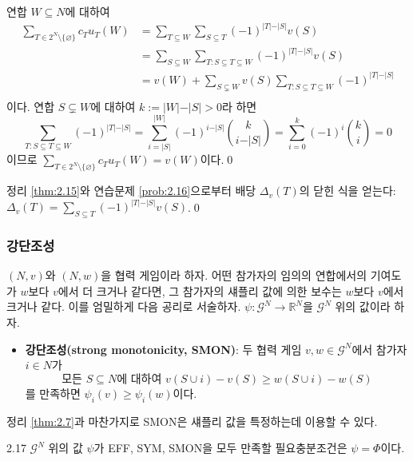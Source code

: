 \documentclass{article}
\numberwithin{equation}{section}
\begin{document}
\begin{sol}
	연합 $W\subseteq N$에 대하여
	\[
		\begin{aligned}
			\sum_{T\in 2^N\setminus\{\varnothing\}}c_Tu_T(W)&=\sum_{T\subseteq W}\sum_{S\subseteq T}(-1)^{\vert T\vert-\vert S\vert}v(S)\\
			&=\sum_{S\subseteq W}\sum_{T:S\subseteq T\subseteq W}(-1)^{\vert T\vert-\vert S\vert}v(S)\\
			&=v(W)+\sum_{S\subsetneq W}v(S)\sum_{T:S\subseteq T\subseteq W}(-1)^{\vert T\vert-\vert S\vert}\\
		\end{aligned}
	\]
	이다. 연합 $S\subsetneq W$에 대하여 $k:=\vert W\vert-\vert S\vert>0$라 하면
	\[
		\sum_{T:S\subseteq T\subseteq W}(-1)^{\vert T\vert-\vert S\vert}=\sum_{i=\vert S\vert}^{\vert W\vert}(-1)^{i-\vert S\vert}\binom{k}{i-\vert S\vert}=\sum_{i=0}^k(-1)^i\binom{k}{i}=0
	\]
	이므로 $\sum_{T\in 2^N\setminus\{\varnothing\}}c_Tu_T(W)=v(W)$이다.\qed
\end{sol}

\begin{remark}
	정리 \ref{thm:2.15}와 연습문제 \ref{prob:2.16}으로부터 배당 $\Delta_v(T)$의 닫힌 식을 얻는다: $\Delta_v(T)=\sum_{S\subseteq T}(-1)^{\vert T\vert-\vert S\vert}v(S)$.\qed
\end{remark}

\subsubsection*{강단조성}
$(N,v)$와 $(N,w)$을 협력 게임이라 하자. 어떤 참가자의 임의의 연합에서의 기여도가 $w$보다 $v$에서 더 크거나 같다면, 그 참가자의 섀플리 값에 의한 보수는 $w$보다 $v$에서 크거나 같다. 이를 엄밀하게 다음 공리로 서술하자. $\psi:\mathcal G^N\to\mathbb R^N$을 $\mathcal G^N$ 위의 값이라 하자.
\begin{itemize}
	\item \textbf{강단조성(strong monotonicity, SMON)}: 두 협력 게임 $v,w\in\mathcal G^N$에서 참가자 $i\in N$가
	\[
		\text{모든 }S\subseteq N\text{에 대하여 }v(S\cup i)-v(S)\geq w(S\cup i)-w(S)
	\]
	를 만족하면 $\psi_i(v)\geq\psi_i(w)$이다.
\end{itemize}

정리 \ref{thm:2.7}과 마찬가지로 SMON은 섀플리 값을 특정하는데 이용할 수 있다.

\begin{thm}{}{2.17}
	$\mathcal G^N$ 위의 값 $\psi$가 EFF, SYM, SMON을 모두 만족할 필요충분조건은 $\psi=\Phi$이다.
\end{thm}
\end{document}
